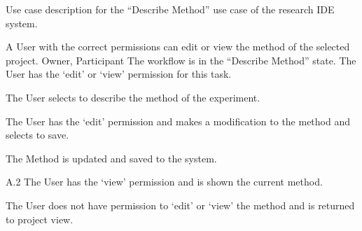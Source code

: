 \documentclass[document.tex]{subfiles}
\begin{document}
\begin{table}
  \centering
  \caption{Use case description for the ``Describe Method'' use case of the research IDE system.}
  \label{tbl:use-case-describe-method}

  \begin{usecase}
    A User with the correct permissions can edit or view the method of the selected project.
    Owner, Participant
    The workflow is in the “Describe Method” state. The User has the ‘edit’ or ‘view’ permission for this task.
    \ucnormal
    \begin{ucenum}
      \item The User selects to describe the method of the experiment.
      \item The User has the ‘edit’ permission and makes a modification to the method and selects to save.
      \item The Method is updated and saved to the system.
    \end{ucenum}
    \begin{ucenum}
      \item [A.2] The User has the ‘view’ permission and is shown the current method.
    \end{ucenum}
    The User does not have permission to ‘edit’ or ‘view’ the method and is returned to project view.
  \end{usecase}
\end{table}
\end{document}
